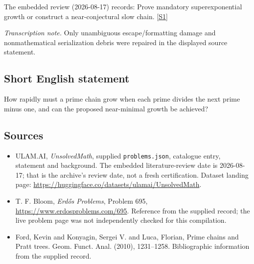 \documentclass[11pt,a4paper]{article}
\newcommand{\sref}[2]{\hyperlink{source:#1:#2}{[S#2]}}
\begin{document}
The embedded review (2026-08-17) records: Prove mandatory superexponential growth or construct a near-conjectural slow chain. \sref{statement}{1}

{\small\emph{Transcription note.} Only unambiguous escape/formatting damage and nonmathematical serialization debris were repaired in the displayed source statement.}

\subsection{Short English statement}

How rapidly must a prime chain grow when each prime divides the next prime minus one, and can the proposed near-minimal growth be achieved?

\subsection{Sources}

{\small

\begin{itemize}

\item[\hypertarget{source:statement:1}{S1}] ULAM.AI, \emph{UnsolvedMath}, supplied \texttt{problems.json}, catalogue entry, statement and background. The embedded literature-review date is 2026-08-17; that is the archive’s review date, not a fresh certification. Dataset landing page: \url{https://huggingface.co/datasets/ulamai/UnsolvedMath}.

\item[\hypertarget{source:statement:2}{S2}] T. F. Bloom, \emph{Erdős Problems}, Problem 695, \url{https://www.erdosproblems.com/695}. Reference from the supplied record; the live problem page was not independently checked for this compilation.

\item[\hypertarget{source:statement:3}{S3}] Ford, Kevin and Konyagin, Sergei V. and Luca, Florian, Prime chains and {P}ratt trees. Geom. Funct. Anal. (2010), 1231--1258. Bibliographic information from the supplied record.

\end{itemize}

}

\label{end:statement}
\end{document}

